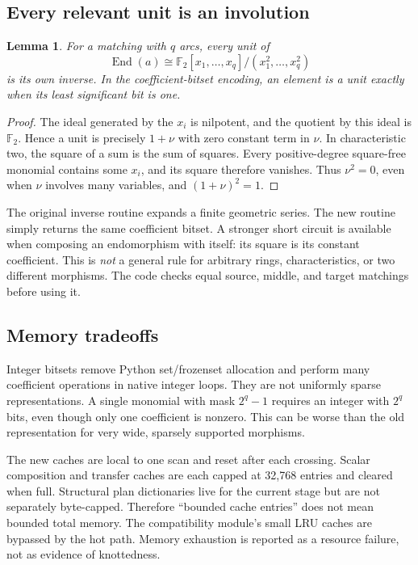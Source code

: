 \documentclass[11pt]{article}
\newtheorem{lemma}[proposition]{Lemma}
\newcommand{\F}{\mathbb F}
\newcommand{\End}{\operatorname{End}}
\begin{document}
\subsection{Every relevant unit is an involution}

\begin{lemma}\label{lem:unit}
For a matching with $q$ arcs, every unit of
\[
 \End(a)\cong\F_2[x_1,\ldots,x_q]/(x_1^2,\ldots,x_q^2)
\]
is its own inverse. In the coefficient-bitset encoding, an element is a unit
exactly when its least significant bit is one.
\end{lemma}
\begin{proof}
The ideal generated by the $x_i$ is nilpotent, and the quotient by this ideal
is $\F_2$. Hence a unit is precisely $1+\nu$ with zero constant term in $\nu$.
In characteristic two, the square of a sum is the sum of squares. Every
positive-degree square-free monomial contains some $x_i$, and its square
therefore vanishes. Thus $\nu^2=0$, even when $\nu$ involves many variables,
and $(1+\nu)^2=1$.
\end{proof}

The original inverse routine expands a finite geometric series. The new
routine simply returns the same coefficient bitset. A stronger short circuit
is available when composing an endomorphism with itself: its square is its
constant coefficient. This is \emph{not} a general rule for arbitrary rings,
characteristics, or two different morphisms. The code checks equal source,
middle, and target matchings before using it.

\subsection{Memory tradeoffs}

Integer bitsets remove Python set/frozenset allocation and perform many
coefficient operations in native integer loops. They are not uniformly sparse
representations. A single monomial with mask $2^q-1$ requires an integer with
$2^q$ bits, even though only one coefficient is nonzero. This can be worse than
the old representation for very wide, sparsely supported morphisms.

The new caches are local to one scan and reset after each crossing.
Scalar composition and transfer caches are each capped at 32,768 entries and
cleared when full. Structural plan dictionaries live for the current stage
but are not separately byte-capped. Therefore ``bounded cache entries'' does
not mean bounded total memory. The compatibility module's small LRU caches
are bypassed by the hot path. Memory exhaustion is reported as a resource
failure, not as evidence of knottedness.
\end{document}
